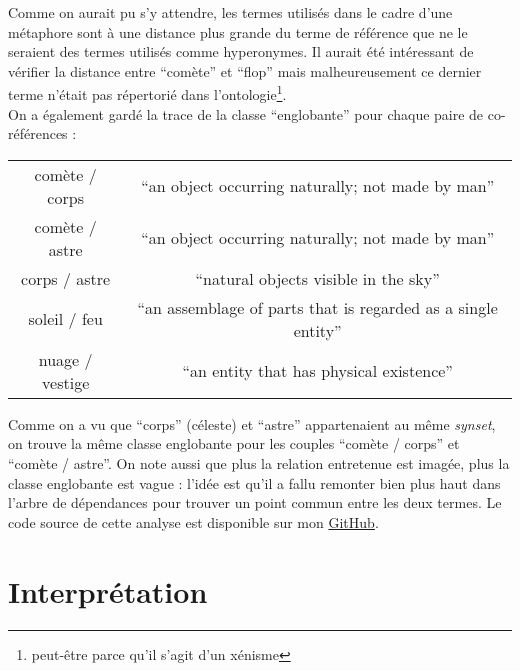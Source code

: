 \documentclass[a4paper,10pt]{article}
\begin{document}
		Comme on aurait pu s'y attendre, les termes utilisés dans le cadre d'une métaphore sont à une distance plus grande du terme de référence que ne le seraient des termes utilisés comme hyperonymes. Il aurait été intéressant de vérifier la distance entre ``comète'' et ``flop'' mais malheureusement ce dernier terme n'était pas répertorié dans l'ontologie\footnote{peut-être parce qu'il s'agit d'un xénisme}.\\
		On a également gardé la trace de la classe ``englobante'' pour chaque paire de co-références :
		\begin{center}
			\begin{tabular}{| c | c |}
				\hline
				comète / corps & ``an object occurring naturally; not made by man'' \\
				comète / astre & ``an object occurring naturally; not made by man'' \\
				corps / astre & ``natural objects visible in the sky'' \\
				soleil / feu & ``an assemblage of parts that is regarded as a single entity'' \\
				nuage / vestige & ``an entity that has physical existence''\\
				\hline
			\end{tabular}
		\end{center}
		Comme on a vu que ``corps'' (céleste) et ``astre'' appartenaient au même \textit{synset}, on trouve la même classe englobante pour les couples ``comète / corps'' et ``comète / astre''. On note aussi que plus la relation entretenue est imagée, plus la classe englobante est vague : l'idée est qu'il a fallu remonter bien plus haut dans l'arbre de dépendances pour trouver un point commun entre les deux termes.
		Le code source de cette analyse est disponible sur mon \href{https://github.com/AdeleMortier/semantic_distance}{GitHub}.
\section{Interprétation}
\end{document}

